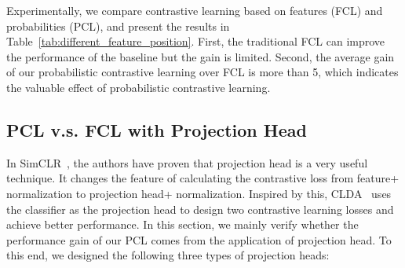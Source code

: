 Experimentally, we compare contrastive learning based on features (FCL) and probabilities (PCL), and present the results in Table~\ref{tab:different_feature_position}.
First, the traditional FCL can improve the performance of the baseline but the gain is limited.
Second, the average gain of our probabilistic contrastive learning over FCL is more than 5, which indicates the valuable effect of probabilistic contrastive learning.




\begin{table}
\centering

\vspace{0.3 mm}
\caption{Ablation study on effect of different features on DomainNet under the setting of -shot and Resnet34.}
\label{tab:different_feature_position}

\end{table} 
\subsection{PCL v.s. FCL with Projection Head}
\label{app:LCL}
In SimCLR~\cite{chen2020simple}, the authors have proven that projection head is a very useful technique. It changes the feature of calculating the contrastive loss from feature+ normalization to projection head+ normalization. Inspired by this, CLDA~\cite{singh2021clda} uses the classifier as the projection head to design two contrastive learning losses and achieve better performance. In this section, we mainly verify whether the performance gain of our PCL comes from the application of projection head. To this end, we designed the following three types of projection heads:

